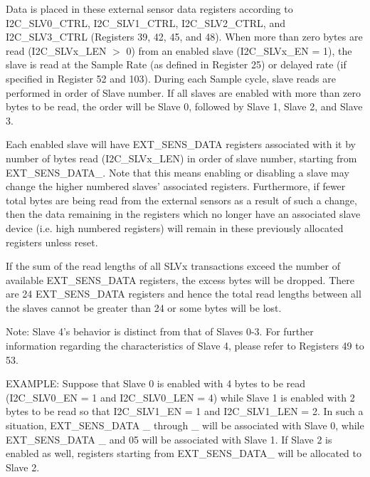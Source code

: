 Data is placed in these external sensor data registers according to I2\+C\+\_\+\+S\+L\+V0\+\_\+\+C\+T\+R\+L, I2\+C\+\_\+\+S\+L\+V1\+\_\+\+C\+T\+R\+L, I2\+C\+\_\+\+S\+L\+V2\+\_\+\+C\+T\+R\+L, and I2\+C\+\_\+\+S\+L\+V3\+\_\+\+C\+T\+R\+L (Registers 39, 42, 45, and 48). When more than zero bytes are read (I2\+C\+\_\+\+S\+L\+Vx\+\_\+\+L\+E\+N $>$ 0) from an enabled slave (I2\+C\+\_\+\+S\+L\+Vx\+\_\+\+E\+N = 1), the slave is read at the Sample Rate (as defined in Register 25) or delayed rate (if specified in Register 52 and 103). During each Sample cycle, slave reads are performed in order of Slave number. If all slaves are enabled with more than zero bytes to be read, the order will be Slave 0, followed by Slave 1, Slave 2, and Slave 3.

Each enabled slave will have E\+X\+T\+\_\+\+S\+E\+N\+S\+\_\+\+D\+A\+T\+A registers associated with it by number of bytes read (I2\+C\+\_\+\+S\+L\+Vx\+\_\+\+L\+E\+N) in order of slave number, starting from E\+X\+T\+\_\+\+S\+E\+N\+S\+\_\+\+D\+A\+T\+A\+\_. Note that this means enabling or disabling a slave may change the higher numbered slaves' associated registers. Furthermore, if fewer total bytes are being read from the external sensors as a result of such a change, then the data remaining in the registers which no longer have an associated slave device (i.\+e. high numbered registers) will remain in these previously allocated registers unless reset.

If the sum of the read lengths of all S\+L\+Vx transactions exceed the number of available E\+X\+T\+\_\+\+S\+E\+N\+S\+\_\+\+D\+A\+T\+A registers, the excess bytes will be dropped. There are 24 E\+X\+T\+\_\+\+S\+E\+N\+S\+\_\+\+D\+A\+T\+A registers and hence the total read lengths between all the slaves cannot be greater than 24 or some bytes will be lost.

Note\+: Slave 4's behavior is distinct from that of Slaves 0-\/3. For further information regarding the characteristics of Slave 4, please refer to Registers 49 to 53.

E\+X\+A\+M\+P\+L\+E\+: Suppose that Slave 0 is enabled with 4 bytes to be read (I2\+C\+\_\+\+S\+L\+V0\+\_\+\+E\+N = 1 and I2\+C\+\_\+\+S\+L\+V0\+\_\+\+L\+E\+N = 4) while Slave 1 is enabled with 2 bytes to be read so that I2\+C\+\_\+\+S\+L\+V1\+\_\+\+E\+N = 1 and I2\+C\+\_\+\+S\+L\+V1\+\_\+\+L\+E\+N = 2. In such a situation, E\+X\+T\+\_\+\+S\+E\+N\+S\+\_\+\+D\+A\+T\+A \+\_ through \+\_ will be associated with Slave 0, while E\+X\+T\+\_\+\+S\+E\+N\+S\+\_\+\+D\+A\+T\+A \+\_ and 05 will be associated with Slave 1. If Slave 2 is enabled as well, registers starting from E\+X\+T\+\_\+\+S\+E\+N\+S\+\_\+\+D\+A\+T\+A\+\_ will be allocated to Slave 2.

